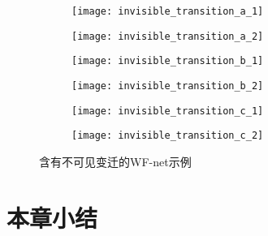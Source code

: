 \begin{figure}[htbp]
  \centering
  \begin{subfigure}{1\textwidth}
    \centering
    \begin{minipage}[b]{1\textwidth}
      \centering
      \texttt{[image: invisible\_transition\_a\_1]}
    \end{minipage}
    \begin{minipage}[b]{1\textwidth}
      \vspace{1em}
      \centering
      \texttt{[image: invisible\_transition\_a\_2]}
    \end{minipage}
    \caption{}
    \label{fig:invisible_transition_a}
  \end{subfigure}
  \begin{subfigure}{1\textwidth}
    \centering
    \begin{minipage}[b]{1\textwidth}
      \vspace{1em}
      \centering
      \texttt{[image: invisible\_transition\_b\_1]}
    \end{minipage}
    \begin{minipage}[b]{1\textwidth}
      \vspace{1em}
      \centering
      \texttt{[image: invisible\_transition\_b\_2]}
    \end{minipage}
    \caption{}
    \label{fig:invisible_transition_b}
  \end{subfigure}
  \begin{subfigure}{1\textwidth}
    \centering
    \begin{minipage}[b]{1\textwidth}
      \vspace{1em}
      \centering
      \texttt{[image: invisible\_transition\_c\_1]}
    \end{minipage}
    \begin{minipage}[b]{1\textwidth}
      \vspace{1em}
      \centering
      \texttt{[image: invisible\_transition\_c\_2]}
    \end{minipage}
    \caption{}
    \label{fig:invisible_transition_c}
  \end{subfigure}
  \caption{含有不可见变迁的WF-net示例}
  \label{fig:invisible_transition_examples}
\end{figure}

\section{本章小结}